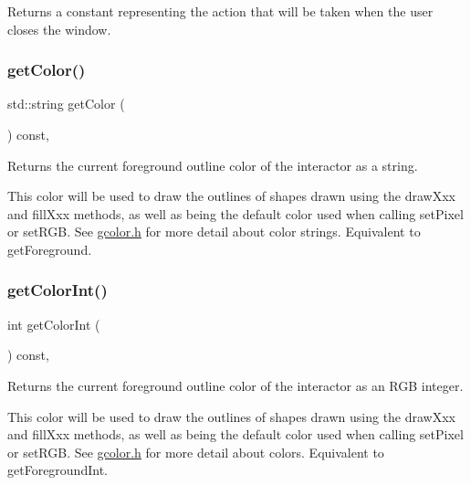 Returns a constant representing the action that will be taken when the user closes the window. 

\mbox{\label{classGDrawingSurface_aa061dfa488c31e18549d64363c1d0e34}} 
\subsubsection{\texorpdfstring{get\+Color()}{getColor()}}
{\footnotesize\ttfamily std\+::string get\+Color (\begin{DoxyParamCaption}{ }\end{DoxyParamCaption}) const\hspace{0.3cm}{\ttfamily [virtual]}, {\ttfamily [inherited]}}



Returns the current foreground outline color of the interactor as a string. 

This color will be used to draw the outlines of shapes drawn using the draw\+Xxx and fill\+Xxx methods, as well as being the default color used when calling set\+Pixel or set\+R\+GB. See \mbox{\hyperlink{gcolor_8h_source}{gcolor.\+h}} for more detail about color strings. Equivalent to get\+Foreground. \mbox{\label{classGDrawingSurface_a9635c7af766cdc3417f346683fa0e6c1}} 
\subsubsection{\texorpdfstring{get\+Color\+Int()}{getColorInt()}}
{\footnotesize\ttfamily int get\+Color\+Int (\begin{DoxyParamCaption}{ }\end{DoxyParamCaption}) const\hspace{0.3cm}{\ttfamily [virtual]}, {\ttfamily [inherited]}}



Returns the current foreground outline color of the interactor as an R\+GB integer. 

This color will be used to draw the outlines of shapes drawn using the draw\+Xxx and fill\+Xxx methods, as well as being the default color used when calling set\+Pixel or set\+R\+GB. See \mbox{\hyperlink{gcolor_8h_source}{gcolor.\+h}} for more detail about colors. Equivalent to get\+Foreground\+Int. \mbox{\label{classGDrawingSurface_a76f6964a11fde7c78e9751be184e1a3c}} 
